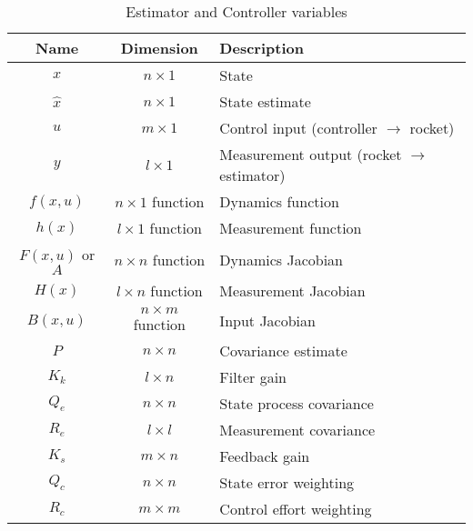 \begin{table}[ht]
\begin{center}
\begin{tabular}{c c l}
Name & Dimension  & Description \\
\hline 
$x$ & $n {\times} 1$ & State\\
$\hat x$ & $n {\times} 1$ & State estimate\\
$u$ & $m {\times} 1$ & Control input (controller $\rightarrow$ rocket) \\
$y$ & $l {\times} 1$ & Measurement output (rocket $\rightarrow$ estimator)\\
\hline
$f(x,u)$ & $n {\times} 1$ function & Dynamics function \\
$h(x)$ & $l {\times} 1$ function & Measurement function \\
$F(x, u)$ or $A$ & $n {\times} n$ function & Dynamics Jacobian  \\
$H(x)$ & $l {\times} n$ function & Measurement Jacobian  \\
$B(x, u)$ & $n {\times} m$  function & Input Jacobian  \\
\hline
$P$ & $n {\times} n$  & Covariance estimate \\
$K_k$ & $l {\times} n$  & Filter gain  \\
$Q_e$ & $n {\times} n$  & State process covariance  \\
$R_e$ & $l {\times} l$  & Measurement covariance  \\
\hline
$K_s$ & $m {\times} n$  & Feedback gain  \\
$Q_c$ & $n {\times} n$  & State error weighting  \\
$R_c$ & $m {\times} m$  & Control effort weighting 
\end{tabular}
\end{center}
\caption{Estimator and Controller variables} \label{tab:symbols_theory}
\end{table}

